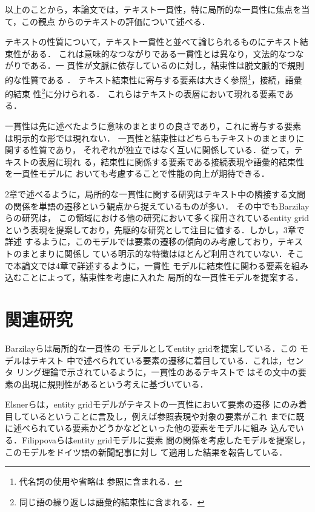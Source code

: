 \documentclass[japanese]{jnlp_1.4}
\begin{document}
 以上のことから，本論文では，テキスト一貫性，特に局所的な一貫性に焦点を当て，この観点
 からのテキストの評価について述べる．

 テキストの性質について，テキスト一貫性と並べて論じられるものにテキスト結束性\cite{halliday1976}がある．
 これは意味的なつながりである一貫性とは異なり，文法的なつながりである．一
 貫性が文脈に依存しているのに対し，結束性は脱文脈的で規則的な性質である
 \cite{iori2007}．
 テキスト結束性に寄与する要素は大きく参照\footnote{代名詞の使用や省略は
 参照に含まれる．}，接続，語彙的結束
 性\footnote{同じ語の繰り返しは語彙的結束性に含まれる．}に分けられる．
 これらはテキストの表層において現れる要素である．

 一貫性は先に述べたように意味のまとまりの良さであり，これに寄与する要素
 は明示的な形では現れない．
 一貫性と結束性はどちらもテキストのまとまりに関する性質であり，
 それぞれが独立ではなく互いに関係している．従って，テキストの表層に現れ
 る，結束性に関係する要素である接続表現や語彙的結束性を一貫性モデルに
 おいても考慮することで性能の向上が期待できる．

 2章で述べるように，局所的な一貫性に関する研究はテキスト中の隣接する文間
 の関係を単語の遷移という観点から捉えているものが多い．
 その中でもBarzilayら\cite{barzilay2005,barzilay2008}の研究は，
 この領域における他の研究において多く採用されているentity gridという表現を提案しており，先駆的な研究として注目に値する．しかし，3章で詳述
 するように，このモデルでは要素の遷移の傾向のみ考慮しており，テキストのまとまりに関係し
 ている明示的な特徴はほとんど利用されていない．そこで本論文では4章で詳述するように，一貫性
 モデルに結束性に関わる要素を組み込むことによって，結束性を考慮に入れた
 局所的な一貫性モデルを提案する．

  
 \section{関連研究}\label{relatedwork}

 Barzilayら\cite{barzilay2005,barzilay2008}は局所的な一貫性の
 モデルとしてentity gridを提案している．この
 モデルはテキスト
 中で述べられている要素の遷移に着目している．これは，センタ
 リング理論\cite{grosz1995}で示されているように，一貫性のあるテキストで
 はその文中の要素の出現に規則性があるという考えに基づいている．

 Elsnerら\cite{elsner2008}は，entity gridモデルがテキストの一貫性において要素の遷移
 にのみ着目しているということに言及し，例えば参照表現や対象の要素がこれ
 までに既に述べられている要素かどうかなどといった他の要素をモデルに組み
 込んでいる．Filippovaら\cite{katja2007}はentity gridモデルに要素
 間の関係を考慮したモデルを提案し，このモデルをドイツ語の新聞記事に対し
 て適用した結果を報告している．
\end{document}
